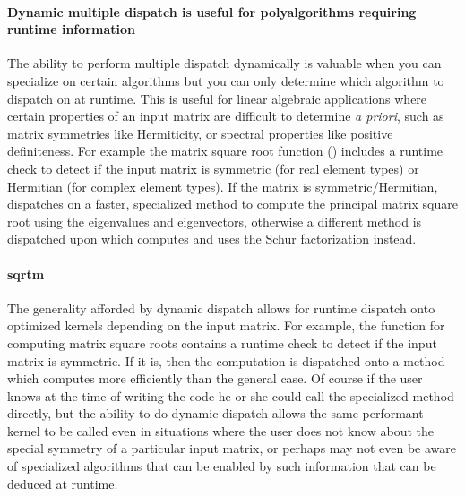 \documentclass[pldi]{sigplanconf-pldi15}
\begin{document}
\paragraph{Dynamic multiple dispatch is useful for polyalgorithms requiring runtime information}
The ability to perform multiple dispatch dynamically is valuable when you can
specialize on certain algorithms but you can only determine which algorithm to
dispatch on at runtime. This is useful for linear algebraic applications where
certain properties of an input matrix are difficult to determine \textit{a
priori}, such as matrix symmetries like Hermiticity, or spectral properties
like positive definiteness. For example the matrix square root function
() includes a runtime check to detect if the input matrix is
symmetric (for real element types) or Hermitian (for complex element types). If
the matrix is symmetric/Hermitian,  dispatches on a faster,
specialized method to compute the principal matrix square root using the
eigenvalues and eigenvectors, otherwise a different method is dispatched upon
which computes and uses the Schur factorization instead.

\paragraph{sqrtm}
The generality afforded by dynamic dispatch allows for runtime dispatch onto
optimized kernels depending on the input matrix. For example, the
 function for computing matrix square roots contains a
runtime check to detect if the input matrix is symmetric. If it is, then the
computation is dispatched onto a  method which
computes more efficiently than the general case. Of course if the user knows at
the time of writing the code he or she could call the specialized method
directly, but the ability to do dynamic dispatch allows the same performant
kernel to be called even in situations where the user does not know about the
special symmetry of a particular input matrix, or perhaps may not even be aware
of specialized algorithms that can be enabled by such information that can be
deduced at runtime.
\end{document}
